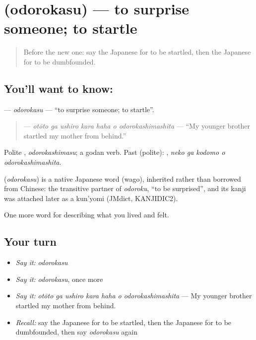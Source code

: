 \section[\texorpdfstring{\ja{おどろかす} (odorokasu)}{おどろかす (odorokasu)}]{ (odorokasu) — to surprise someone; to startle}

\label{lesson:JA-C431-odorokasu}



\begin{quote}
Before the new one: say the Japanese for to be startled, then the Japanese for to be dumbfounded.
\end{quote}

\subsection*{You'll want to know: }
\textbf{} — \emph{odorokasu} — \textquotedblleft{}to surprise someone; to startle\textquotedblright{}.

\begin{quote}
\textbf{   } — \emph{otōto ga ushiro kara haha o odorokashimashita} — \textquotedblleft{}My younger brother startled my mother from behind.\textquotedblright{}
\end{quote}

Polite \textbf{}, \emph{odorokashimasu}; a godan verb. Past (polite): \textbf{  }, \emph{neko ga kodomo o odorokashimashita}.

\begin{cousinweb}
\textbf{} (\emph{odorokasu}) is a native Japanese word (wago), inherited rather than borrowed from Chinese: the transitive partner of \emph{odoroku}, \textquotedblleft{}to be surprised\textquotedblright{}, and its kanji was attached later as a kun'yomi (JMdict, KANJIDIC2).
\end{cousinweb}

\begin{grammarlens}[title={What you've built}]
One more word for describing what you lived and felt.
\end{grammarlens}

\subsection*{Your turn}
\begin{itemize}
\raggedright
  \item \emph{Say it:} \emph{odorokasu}
  \item \emph{Say it:} \emph{odorokasu}, once more
  \item \emph{Say it:} \emph{otōto ga ushiro kara haha o odorokashimashita} — My younger brother startled my mother from behind.
  \item \emph{Recall:} say the Japanese for to be startled, then the Japanese for to be dumbfounded, then say \emph{odorokasu} again
\end{itemize}

